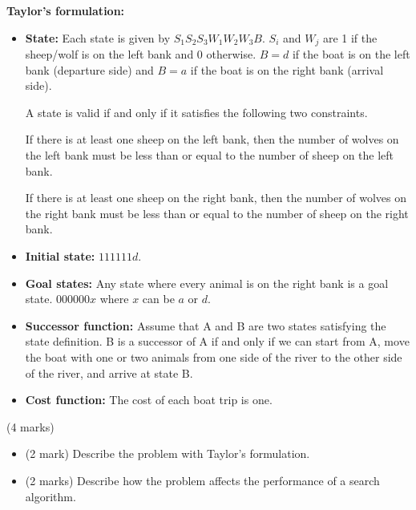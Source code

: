 \documentclass[12pt]{article}
\begin{document}
\begin{enumerate}[(a)]
\begin{example}

{\bf Taylor's formulation:}
\begin{itemize}
\item
{\bf State:} Each state is given by $S_1 S_2 S_3 W_1 W_2 W_3 B$. $S_i$ and $W_j$ are 1 if the sheep/wolf is on the left bank and 0 otherwise. $B = d$ if the boat is on the left bank (departure side) and $B = a$ if the boat is on the right bank (arrival side). 

A state is valid if and only if it satisfies the following two constraints.

If there is at least one sheep on the left bank, then the number of wolves on the left bank must be less than or equal to the number of sheep on the left bank. 

If there is at least one sheep on the right bank, then the number of wolves on the right bank must be less than or equal to the number of sheep on the right bank. 

\item
{\bf Initial state:} $111111d$.

\item
{\bf Goal states:} Any state where every animal is on the right bank is a goal state. $000000x$ where $x$ can be $a$ or $d$.

\item
{\bf Successor function:} Assume that A and B are two states satisfying the state definition. B is a successor of A if and only if we can start from A, move the boat with one or two animals from one side of the river to the other side of the river, and arrive at state B.

\item
{\bf Cost function:} The cost of each boat trip is one.
\end{itemize}

\end{example}

\begin{markscheme}
(4 marks) 
\begin{itemize}
\item
(2 mark) Describe the problem with Taylor's formulation.
\item 
(2 marks) Describe how the problem affects the performance of a search algorithm.
\end{itemize}

\end{markscheme}






\end{enumerate}
\end{document}
